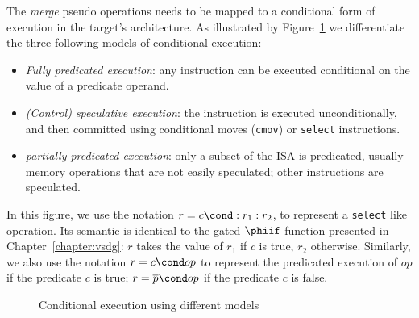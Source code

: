 The \textit{merge} pseudo operations needs to be mapped to a conditional form of execution in the target's architecture. As illustrated by Figure~\ref{fig:pred} we differentiate the three following models of conditional execution:
\begin{itemize}
\item \emph{Fully predicated execution}: any instruction can be executed conditional on the value of a predicate operand.
\item \emph{(Control) speculative execution}: the instruction is executed unconditionally, and then committed using conditional moves (\texttt{cmov}) or \texttt{select} instructions. 
\item \emph{partially predicated execution}: only a subset of the ISA is predicated, usually memory operations that are not easily speculated; other instructions are speculated.
\end{itemize}
In this figure, we use the notation $r = c \cond :r_1:r_2$, to represent a \texttt{select} like operation. Its semantic is identical to the gated $\phiif$-function presented in Chapter~\ref{chapter:vsdg}: $r$ takes the value of $r_1$ if $c$ is true, $r_2$ otherwise. Similarly, we also use the notation $r = c \cond op$ to represent the predicated execution of $op$ if the predicate $c$ is true; $r = \overline{p} \cond op$ if the predicate $c$ is false.

\begin{figure}[h]
\footnotesize
{}
\hfill
{} \hfill
{}
\caption{Conditional execution using different models}
\label{fig:pred}
\end{figure}

